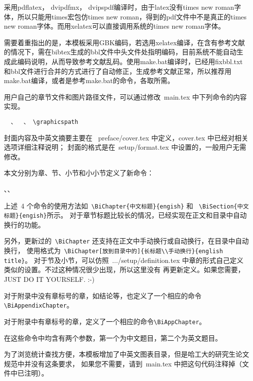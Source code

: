 采用pdflatex， dvipdfmx， dvipspdf编译时，由于latex没有times new roman字体，所以只能用times宏包仿times new roman，得到的pdf文件中不是真正的times new roman字体。而用xelatex可以直接调用系统的times new roman字体。

需要着重指出的是，本模板采用GBK编码，若选用xelatex编译，在含有参考文献的情况下，需在bibtex生成的bbl文件中头文件处指明编码，目前系统不能自动生成此编码说明，从而导致参考文献乱码。使用make.bat编译时，已经用fixbbl.txt和bbl文件进行合并的方式进行了自动修正，生成参考文献正常，所以推荐用make.bat编译，或者是参考make.bat的命令，各取所需。

用户自己的章节文件和图片路径文件，可以通过修改~main.tex 中下列命令的内容实现。\vspace{-5pt}
\begin{verbatim}
  、  、 \graphicspath
\end{verbatim}

封面内容及中英文摘要主要在~ preface/cover.tex 中定义，cover.tex 中已经对相关选项详细注释说明；
封面的格式是在~setup/format.tex 中设置的，一般用户无需修改。


\label{Tricks:Contents}
本文分别为章、节、小节和小小节定义了新命令：

\begin{verb}
\BiChapter、\BiSection、\BiSubsubsection
\end{verb}

上述~4 个命令的使用方法如~\verb"\BiChapter{中文标题}{engish}" 和 ~\verb"\BiSection{中文标题}{engish}"所示。
对于章节标题比较长的情况，已经实现在正文和目录中自动换行的功能。

另外，更新过的~\verb"\BiChapter" 还支持在正文中手动换行或自动换行，在目录中自动换行，
使用格式为~\verb"\BiChapter[放到目录中的]{长标题\\手动换行}{english title}"。
对于节及小节，可以仿照~.../setup/definition.tex 中章的形式自己定义类似的设置。不过这种情况很少出现，所以这里没有
再更新定义。如果您需要，JUST DO IT YOURSELF. :-)

对于附录中没有章标号的章，如结论等，也定义了一个相应的命令\verb"\BiAppendixChapter"。

对于附录中有章标号的章，定义了一个相应的命令\verb"\BiAppChapter"。

在这些命令中均含有两个参数，第一个为中文题目，第二个为英文题目。

为了浏览统计查找方便，本模板增加了中英文图表目录，但是哈工大的研究生论文规范中并没有这条要求，
如果您不需要，请到~main.tex 中把这句代码注释掉（文件中已注明）。
\begin{verb}
   
\end{verb}

